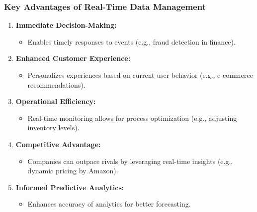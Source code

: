 \documentclass[aspectratio=169]{beamer}
\begin{document}
\begin{frame}[fragile]
    \frametitle{Key Advantages of Real-Time Data Management}
    \begin{enumerate}
        \item \textbf{Immediate Decision-Making:}
            \begin{itemize}
                \item Enables timely responses to events (e.g., fraud detection in finance).
            \end{itemize}
        
        \item \textbf{Enhanced Customer Experience:}
            \begin{itemize}
                \item Personalizes experiences based on current user behavior (e.g., e-commerce recommendations).
            \end{itemize}

        \item \textbf{Operational Efficiency:}
            \begin{itemize}
                \item Real-time monitoring allows for process optimization (e.g., adjusting inventory levels).
            \end{itemize}

        \item \textbf{Competitive Advantage:}
            \begin{itemize}
                \item Companies can outpace rivals by leveraging real-time insights (e.g., dynamic pricing by Amazon).
            \end{itemize}
        
        \item \textbf{Informed Predictive Analytics:}
            \begin{itemize}
                \item Enhances accuracy of analytics for better forecasting.
            \end{itemize}
    \end{enumerate}
\end{frame}
\end{document}
